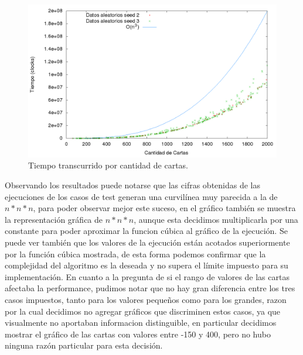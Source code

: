 \begin{figure}[h]
\begin{center}
\includegraphics[scale=0.6]{./img/ej1_chart.png}
\caption{Tiempo transcurrido por cantidad de cartas.}
\end{center}
\end{figure}

Observando los resultados puede notarse que las cifras obtenidas de las ejecuciones de los casos de test generan una curvil\'inea muy parecida a la de $n*n*n$, para poder observar mejor este suceso, en el gr\'afico tambi\'en se muestra la representaci\'on gr\'afica de $n*n*n$, aunque esta decidimos multiplicarla por una constante para poder aproximar la funcion c\'ubica al gr\'afico de la ejecuci\'on.
Se puede ver tambi\'en que los valores de la ejecuci\'on est\'an acotados superiormente por la funci\'on c\'ubica mostrada, de esta forma podemos confirmar que la complejidad del algoritmo es la deseada y no supera el l\'imite impuesto para su implementaci\'on.
En cuanto a la pregunta de si el rango de valores de las cartas afectaba la performance, pudimos notar que no hay gran diferencia entre los tres casos impuestos, tanto para los valores pequeños como para los grandes, razon por la cual decidimos no agregar gr\'aficos que discriminen estos casos, ya que visualmente no aportaban informacion distinguible, en particular decidimos mostrar el gr\'afico de las cartas con valores entre -150 y 400, pero no hubo ninguna raz\'on particular para esta decisi\'on.
